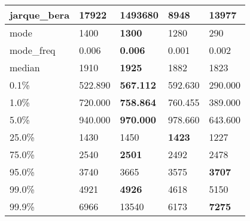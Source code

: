 \begin{table}[H]
\begin{tabular}{|l|m{10em}|m{10em}|m{10em}|m{10em}|}
\hline jarque\_bera & 17922 & \cellcolor[rgb]{0.9, 0.54, 0.52} 1493680 & 8948 & \bfseries 13977 \\
\hline mode & 1400 & \bfseries 1300 & 1280 & \cellcolor[rgb]{0.9, 0.54, 0.52} 290 \\
\hline mode\_freq & 0.006 & \bfseries 0.006 & \cellcolor[rgb]{0.9, 0.54, 0.52} 0.001 & 0.002 \\
\hline median & 1910 & \bfseries 1925 & 1882 & \cellcolor[rgb]{0.9, 0.54, 0.52} 1823 \\
\hline 0.1\% & 522.890 & \bfseries 567.112 & 592.630 & \cellcolor[rgb]{0.9, 0.54, 0.52} 290.000 \\
\hline 1.0\% & 720.000 & \bfseries 758.864 & 760.455 & \cellcolor[rgb]{0.9, 0.54, 0.52} 389.000 \\
\hline 5.0\% & 940.000 & \bfseries 970.000 & 978.660 & \cellcolor[rgb]{0.9, 0.54, 0.52} 643.600 \\
\hline 25.0\% & 1430 & 1450 & \bfseries 1423 & \cellcolor[rgb]{0.9, 0.54, 0.52} 1227 \\
\hline 75.0\% & 2540 & \bfseries 2501 & 2492 & \cellcolor[rgb]{0.9, 0.54, 0.52} 2478 \\
\hline 95.0\% & 3740 & 3665 & \cellcolor[rgb]{0.9, 0.54, 0.52} 3575 & \bfseries 3707 \\
\hline 99.0\% & 4921 & \bfseries 4926 & \cellcolor[rgb]{0.9, 0.54, 0.52} 4618 & 5150 \\
\hline 99.9\% & 6966 & \cellcolor[rgb]{0.9, 0.54, 0.52} 13540 & 6173 & \bfseries 7275 \\
\hline
\end{tabular}
\end{table}
